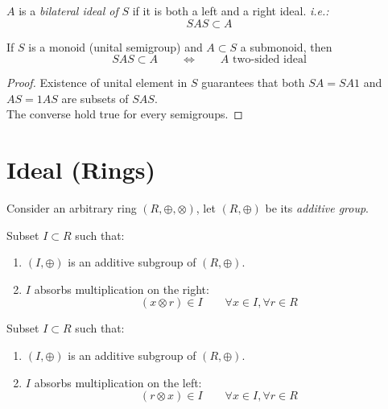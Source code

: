 \documentclass[a4paper,12pt]{scrartcl}    %
\newcommand{\OpA}{\otimes}
\newcommand{\OpB}{\oplus}
\begin{document}
	\begin{definition}
		$A$ is a \emph{bilateral ideal of} $S$ if it is both a left and a right ideal.
		\textit{i.e.:}
		\begin{displaymath}
			S A S \subset A 
		\end{displaymath}
	\end{definition}
	
	\begin{proposition}
		If $S$ is a monoid (unital semigroup) and $A \subset S$ a submonoid, then	
		\begin{displaymath}
			  S A S \subset A \qquad \Leftrightarrow \qquad A\textrm{ two-sided ideal}
		\end{displaymath}
	\end{proposition}
	\begin{proof}
	Existence of unital element in $S$ guarantees that both $S A= S A {1}$ and $A S = {1} A S $ are subsets of $S A S$.\\	
	The converse hold true for every semigroups.
	\end{proof}

	\section{Ideal (Rings)}
	Consider an arbitrary ring $(R,\OpB,\OpA)$, let $(R,\OpB)$ be its \emph{additive group}.
	\begin{definition}
		Subset $I \subset R$ such that:
		\begin{enumerate}
			\item $(I, \OpB)$ is an additive subgroup of $(R, \OpB)$.
			\item $I$ absorbs multiplication on the right:
				\begin{displaymath}
					( x \OpA r ) \in I \qquad \forall  x \in I, \forall r \in R
				\end{displaymath}
		\end{enumerate}
	\end{definition}

	\begin{definition}
		Subset $I \subset R$ such that:
		\begin{enumerate}
			\item $(I, \OpB)$ is an additive subgroup of $(R, \OpB)$.
			\item $I$ absorbs multiplication on the left:
				\begin{displaymath}
					( r \OpA x )\in I \qquad \forall  x \in I, \forall r \in R
				\end{displaymath}
		\end{enumerate}
	\end{definition}
\end{document}
